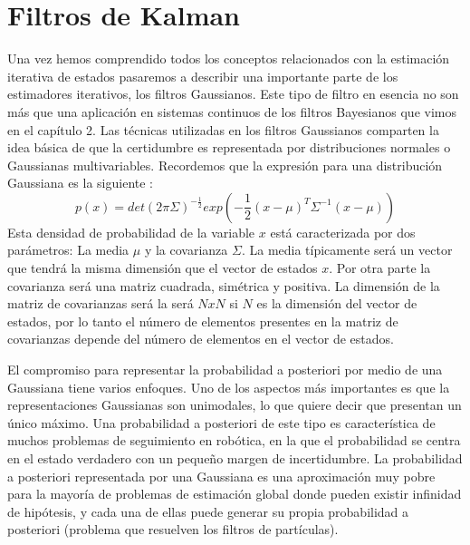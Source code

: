 \pagestyle{scrheadings}
\ihead[]{\rightmark}
\ofoot[]{\thepage{}}
\chapter{Filtros de Kalman}\label{ch:capitulo3}
Una vez hemos comprendido todos los conceptos relacionados con la estimación iterativa de estados pasaremos a describir una importante parte de los estimadores iterativos, los filtros Gaussianos.
%
%
%
Este tipo de filtro en esencia no son más que una aplicación en sistemas continuos de los filtros Bayesianos que vimos en el capítulo 2.
%
%
%
%
%
Las técnicas utilizadas en los filtros Gaussianos comparten la idea básica de que la certidumbre es representada por distribuciones normales o Gaussianas multivariables.
Recordemos que la expresión para una distribución Gaussiana es la siguiente \cite{thrun_probabilistic_2005}:
\begin{equation}\label{dist_Gauss}
p(x) = det(2\pi \Sigma)^{-\frac{1}{2}}exp(-\frac{1}{2}(x-\mu)^{T}\Sigma^{-1}(x-\mu)) 
\end{equation}
Esta densidad de probabilidad de la variable $x$ está caracterizada por dos parámetros: La media $\mu$ y la covarianza $\Sigma$.
La media típicamente será un vector que tendrá la misma dimensión que el vector de estados $x$. 
Por otra parte la covarianza será una matriz cuadrada, simétrica y positiva.
La dimensión de la matriz de covarianzas será la será $NxN$ si $N$ es la dimensión del vector de estados, por lo tanto el número de elementos presentes en la matriz de covarianzas depende del número de elementos en el vector de estados.

El compromiso para representar la probabilidad a posteriori por medio de una Gaussiana tiene varios enfoques.
Uno de los aspectos más importantes es que la representaciones Gaussianas son unimodales, lo que quiere decir que presentan un único máximo.
Una probabilidad a posteriori de este tipo es característica de muchos problemas de seguimiento en robótica, en la que el 
probabilidad se centra en el estado verdadero con un pequeño margen de incertidumbre.
La probabilidad a posteriori representada por una Gaussiana es una aproximación muy pobre para la mayoría de problemas de estimación global donde pueden existir infinidad de hipótesis, y cada una de ellas puede generar su propia probabilidad a posteriori (problema que resuelven los filtros de partículas).

